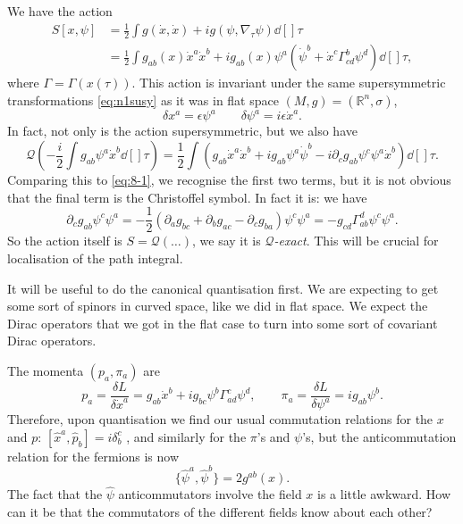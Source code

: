 We have the action
\begin{align}
  S[x, \psi] &= \frac{1}{2} \int g(\dot{x}, \dot{x})  + i g (\psi, \nabla_\tau \psi) \dd[]{\tau} \\
	     &= \frac{1}{2} \int g_{ab}(x) \dot{x}^a \dot{x}^{b} + i g_{ab} (x) \psi^{a} \left( \dot{\psi}^{b} + \dot{x}^{c} \Gamma^{b}_{cd} \psi^{d} \right) \dd[]{\tau}, \label{eq:8-1}
\end{align}
where $\Gamma = \Gamma(x(\tau))$.
This action is invariant under the same supersymmetric transformations \eqref{eq:n1susy} as it was in flat space $(M, g) = (\mathbb{R}^n, \sigma)$, 
\begin{equation}
  \delta x^{a} =  \epsilon \psi^{a} \qquad \delta \psi^{a} = i \epsilon \dot{x}^{a}.
\end{equation}
In fact, not only is the action supersymmetric, but we also have
\begin{equation}
  \mathcal{Q} \left( -\frac{i}{2} \int g_{ab} \psi^{a} \dot{x}^{b} \dd[]{\tau} \right)  =\frac{1}{2} \int \left( g_{ab} \dot{x}^{a} \dot{x}^{b} + i g_{ab} \psi^{a} \dot{\psi}^{b} - i \partial_{c} g_{ab} \psi^{c} \psi^{a} \dot{x} ^{b} \right) \dd[]{\tau}.
\end{equation}
Comparing this to \eqref{eq:8-1}, we recognise the first two terms, but it is not obvious that the final term is the Christoffel symbol.
In fact it is:
we have
\begin{equation}
  \partial_{c} g_{ab} \psi^{c} \psi^{a} = -\frac{1}{2} \left( \partial_{a} g_{bc} + \partial_{b} g_{ac} - \partial_{c} g_{ba} \right) \psi^{c} \psi^{a} = -g_{cd} \Gamma^{d}_{ab} \psi^{c} \psi^{a}.
\end{equation}
So the action itself is $S = \mathcal{Q} (\dots)$, we say it is  \emph{$\mathcal{Q}$-exact}.
This will be crucial for localisation of the path integral.

It will be useful to do the canonical quantisation first. We are expecting to get some sort of spinors in curved space, like we did in flat space.
We expect the Dirac operators that we got in the flat case to turn into some sort of covariant Dirac operators.

The momenta $(p_a, \pi_a)$  are
\begin{equation}
  p_a = \frac{\delta L}{\delta \dot{x}^a} = g_{ab} \dot{x}^b + i g_{bc} \psi^{b} \Gamma^{c}_{ad} \psi^{d}, \qquad
  \pi_a = \frac{\delta L}{\delta \psi^a} = i g_{ab} \psi^{b}.
\end{equation}
Therefore, upon quantisation we find our usual commutation relations for the $x$  and $p$:  $[\hat{x}^a, \hat{p}_b] = i \delta^{c}_b$ , and similarly for the $\pi$'s and $\psi$'s, but the anticommutation relation for the fermions is now
\begin{equation}
  \{\hat{\psi}^a, \hat{\psi}^b\} = 2 g^{ab}(x).
\end{equation}
The fact that the $\hat{\psi}$  anticommutators involve the field $x$ is a little awkward. How can it be that the commutators of the different fields know about each other?

